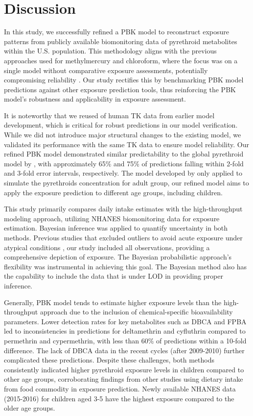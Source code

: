\documentclass[toxics,article,submit,pdftex,moreauthors]{Definitions/mdpi}
\begin{document}
\section{Discussion}

In this study, we successfully refined a PBK model to reconstruct
exposure patterns from publicly available biomonitoring data of
pyrethroid metabolites within the U.S. population. This methodology
aligns with the previous approaches used for methylmercury and
chloroform, where the focus was on a single model without comparative
exposure assessments, potentially compromising reliability
\citep{allen2007use, lyons2008computational}. Our study rectifies this
by benchmarking PBK model predictions against other exposure prediction
tools, thus reinforcing the PBK model's robustness and applicability in
exposure assessment.

It is noteworthy that we reused of human TK data from earlier model
development, which is critical for robust predictions in our model
verification. While we did not introduce major structural changes to the
existing model, we validated its performance with the same TK data to
ensure model reliability. Our refined PBK model demonstrated similar
predictability to the global pyrethroid model by
\citet{quindroit2021estimating}, with approximately 65\% and 75\% of
predictions falling within 2-fold and 3-fold error intervals,
respectively. The model developed by \citet{quindroit2021estimating}
only applied to simulate the pyrethroids concentration for adult group,
our refined model aims to apply the exposure prediction to different age
groups, including children.

This study primarily compares daily intake estimates with the
high-throughput modeling approach, utilizing NHANES biomonitoring data
for exposure estimation. Bayesian inference was applied to quantify
uncertainty in both methods. Previous studies that excluded outliers to
avoid acute exposure under atypical conditions
\citep{bao2020association}, our study included all observations,
providing a comprehensive depiction of exposure. The Bayesian
probabilistic approach's flexibility was instrumental in achieving this
goal. The Bayesian method also has the capability to include the data
that is under LOD in providing proper inference.

Generally, PBK model tends to estimate higher exposure levels than the
high-throughput approach due to the inclusion of chemical-specific
bioavailability parameters. Lower detection rates for key metabolites
such as DBCA and FPBA led to inconsistencies in predictions for
deltamethrin and cyfluthrin compared to permethrin and cypermethrin,
with less than 60\% of predictions within a 10-fold difference. The lack
of DBCA data in the recent cycles (after 2009-2010) further complicated
these predictions. Despite these challenges, both methods consistently
indicated higher pyrethroid exposure levels in children compared to
other age groups, corroborating findings from other studies using
dietary intake from food commodity in exposure prediction. Newly
available NHANES data (2015-2016) for children aged 3-5 have the highest
exposure compared to the older age groups.
\end{document}
